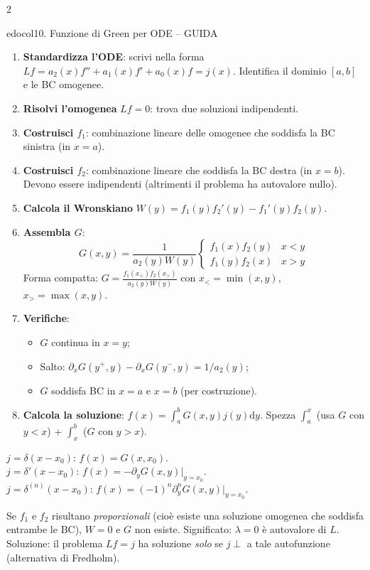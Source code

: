 \documentclass[10pt,a4paper]{article}
\newcommand{\dd}{\mathrm{d}}
\begin{document}
\begin{multicols}{2}
\begin{secbox}{edocol}{10. Funzione di Green per ODE -- GUIDA}
\begin{enumerate}
\item \textbf{Standardizza l'ODE}: scrivi nella forma $Lf=a_2(x)f''+a_1(x)f'+a_0(x)f=j(x)$. Identifica il dominio $[a,b]$ e le BC omogenee.
\item \textbf{Risolvi l'omogenea} $Lf=0$: trova due soluzioni indipendenti.
\item \textbf{Costruisci $f_1$}: combinazione lineare delle omogenee che soddisfa la BC sinistra (in $x=a$).
\item \textbf{Costruisci $f_2$}: combinazione lineare che soddisfa la BC destra (in $x=b$). Devono essere indipendenti (altrimenti il problema ha autovalore nullo).
\item \textbf{Calcola il Wronskiano} $W(y)=f_1(y)f_2'(y)-f_1'(y)f_2(y)$.
\item \textbf{Assembla $G$}:
$$G(x,y)=\frac{1}{a_2(y)W(y)}\begin{cases}f_1(x)f_2(y) & x<y\\ f_1(y)f_2(x) & x>y\end{cases}$$
Forma compatta: $G=\frac{f_1(x_<)f_2(x_>)}{a_2(y)W(y)}$ con $x_<=\min(x,y)$, $x_>=\max(x,y)$.
\item \textbf{Verifiche}:
\begin{itemize}
\item $G$ continua in $x=y$;
\item Salto: $\partial_xG(y^+,y)-\partial_xG(y^-,y)=1/a_2(y)$;
\item $G$ soddisfa BC in $x=a$ e $x=b$ (per costruzione).
\end{itemize}
\item \textbf{Calcola la soluzione}: $f(x)=\int_a^bG(x,y)j(y)\dd y$. Spezza $\int_a^x$ (usa $G$ con $y<x$) + $\int_x^b$ ($G$ con $y>x$).
\end{enumerate}

\textbf{$j=\delta(x-x_0)$}: $f(x)=G(x,x_0)$.\\
\textbf{$j=\delta'(x-x_0)$}: $f(x)=-\partial_yG(x,y)|_{y=x_0}$.\\
\textbf{$j=\delta^{(n)}(x-x_0)$}: $f(x)=(-1)^n\partial_y^nG(x,y)|_{y=x_0}$.

Se $f_1$ e $f_2$ risultano \emph{proporzionali} (cioè esiste una soluzione omogenea che soddisfa entrambe le BC), $W=0$ e $G$ non esiste. Significato: $\lambda=0$ è autovalore di $L$. Soluzione: il problema $Lf=j$ ha soluzione \emph{solo} se $j\perp$ a tale autofunzione (alternativa di Fredholm).


\end{secbox}
\end{multicols}
\end{document}
